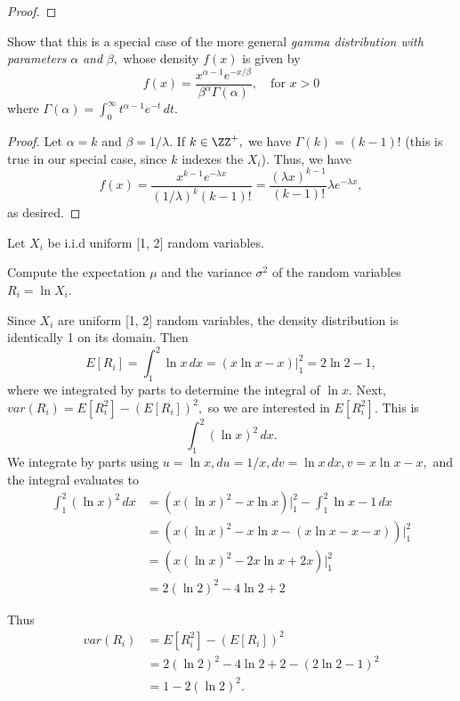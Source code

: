 \documentclass{article}
\begin{document}
\begin{enumerate}
\begin{enumerate}[(a)]
\begin{proof}
				\end{proof}

				\ii Show that this is a special case of the more general \textit{gamma distribution with parameters} $\alpha$ \textit{and} $\beta,$ whose density $f(x)$ is given by \[ f(x) = \frac{x^{\alpha-1}e^{-x/\beta}}{\beta^\alpha\Gamma(\alpha)}, \quad\text{for } x>0 \] where $\Gamma(\alpha)=\int_0^\infty t^{\alpha-1}e^{-t}\, dt.$
				\begin{proof}
					Let $\alpha=k$ and $\beta=1/\lambda.$ If $k\in\ZZ^+,$ we have $\Gamma(k)=(k-1)!$ (this is true in our special case, since $k$ indexes the $X_i$). Thus, we have \[f(x)=\frac{x^{k-1}e^{-\lambda x}}{(1/\lambda)^k(k-1)!} = \frac{(\lambda x)^{k-1}}{(k-1)!}\lambda e^{-\lambda x}, \] as desired.
				\end{proof}

		\end{enumerate}

	\newpage

	\ii Let $X_i$ be i.i.d uniform [1, 2] random variables. 
		
	\begin{enumerate}[(a)]
		\ii Compute the expectation $\mu$ and the variance $\sigma^2$ of the random variables $R_i=\ln X_i.$ 

		\begin{soln}
			Since $X_i$ are uniform [1, 2] random variables, the density distribution is identically 1 on its domain. Then \[E[R_i] = \int_1^2 \ln x\, dx = (x\ln x-x)\bigg|_1^2 = \boxed{2\ln 2 - 1,} \] where we integrated by parts to determine the integral of $\ln x.$
			Next, $var(R_i)=E[R_i^2]-(E[R_i])^2,$ so we are interested in $E[R_i^2].$ This is \[\int_1^2 (\ln x)^2\, dx. \] We integrate by parts using $u=\ln x, du = 1/x, dv = \ln x\, dx, v = x\ln x-x,$ and the integral evaluates to 
			\begin{align*}
				\int_1^2 (\ln x)^2\, dx &= \left( x(\ln x)^2 - x\ln x \right)\bigg|_1^2 - \int_1^2\ln x - 1\, dx \\
				&= \left( x(\ln x)^2-x\ln x - (x\ln x - x - x) \right)\bigg|_1^2 \\
				&= \left( x(\ln x)^2 -2x\ln x + 2x \right)\bigg|_1^2 \\
				&= 2(\ln2)^2 - 4\ln2 + 2
			\end{align*}

			Thus 
			\begin{align*}
				var(R_i) &= E[R_i^2]-(E[R_i])^2 \\
				&= 2(\ln2)^2-4\ln2+2-(2\ln2-1)^2 \\
				&= \boxed{1-2(\ln2)^2.}
			\end{align*}
		\end{soln}


\end{enumerate}
\end{enumerate}
\end{document}
